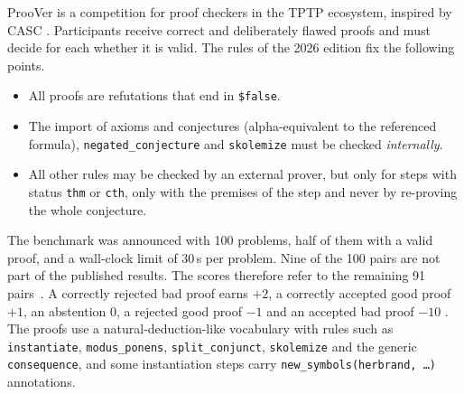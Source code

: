 ProoVer is a competition for proof checkers in the TPTP ecosystem, inspired by CASC \citep{proover-competition}.
Participants receive correct and deliberately flawed proofs and must decide for each whether it is valid.
The rules of the 2026 edition fix the following points.
\begin{itemize}
  \item All proofs are refutations that end in \texttt{\$false}.
  \item The import of axioms and conjectures (alpha-equivalent to the referenced formula), \texttt{negated\_conjecture} and \texttt{skolemize} must be checked \emph{internally}.
  \item All other rules may be checked by an external prover, but only for steps with status \texttt{thm} or \texttt{cth}, only with the premises of the step and never by re-proving the whole conjecture.
\end{itemize}
The benchmark was announced with 100 problems, half of them with a valid proof, and a wall-clock limit of 30\,s per problem.
Nine of the 100 pairs are not part of the published results. The scores therefore refer to the remaining 91 pairs~\citep{ProoVer2026Results}.
A correctly rejected bad proof earns $+2$, a correctly accepted good proof $+1$, an abstention $0$, a rejected good proof $-1$ and an accepted bad proof $-10$ \citep{ProoVer2026Proceedings}.
The proofs use a natural-deduction-like vocabulary with rules such as \texttt{instantiate}, \texttt{modus\_ponens}, \texttt{split\_conjunct}, \texttt{skolemize} and the generic \texttt{consequence}, and some instantiation steps carry \texttt{new\_symbols(herbrand, \dots)} annotations.
